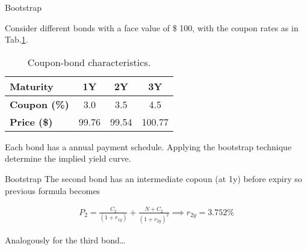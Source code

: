\documentclass{beamer}
\begin{document}
\begin{frame}{Bootstrap}
\begin{block}{}
Consider different bonds with a face value of \$ 100, with the coupon rates as in Tab.\ref{tab:coupons}.

\begin{table}[htb]
  \begin{center}
    \begin{tabular}{|l|c|c|c|}
      \hline
      \textbf{Maturity}    & 1Y    & 2Y     & 3Y     \\ \hline
      \textbf{Coupon (\%)} & 3.0   & 3.5    & 4.5    \\ \hline
      \textbf{Price (\$)}  & 99.76 & 99.54  & 100.77 \\ \hline
    \end{tabular}
    \end{center}
    \caption{Coupon-bond characteristics.}
    \label{tab:coupons}
  \end{table}
Each bond has a annual payment schedule. Applying the bootstrap technique determine the implied yield curve.
\end{block}
\end{frame}

\begin{frame}{Bootstrap}
The second bond has an intermediate copoun (at 1y) before expiry so previous formula becomes

\begin{equation*}
  \begin{gathered}
    P_2 = \frac{C_2}{(1+r_{1y})} + \frac{N + C_2}{(1+r_{2y})^2} \implies r_{2y} = 3.752 \%
  \end{gathered}
\end{equation*}

Analogously for the third bond\ldots
\end{frame}
\end{document}
